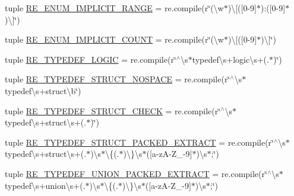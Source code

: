 \begin{DoxyCompactItemize}
\item 
tuple \hyperlink{namespacesrc_1_1regex_ae388af59d56dc2df9faf7175657b3ad9}{R\-E\-\_\-\-E\-N\-U\-M\-\_\-\-I\-M\-P\-L\-I\-C\-I\-T\-\_\-\-R\-A\-N\-G\-E} = re.\-compile(r\char`\"{}(\textbackslash{}w$\ast$)\textbackslash{}\mbox{[}(\mbox{[}0-\/9\mbox{]}$\ast$)\-:(\mbox{[}0-\/9\mbox{]}$\ast$)\textbackslash{}\mbox{]}\char`\"{})
\item 
tuple \hyperlink{namespacesrc_1_1regex_ac607fce0aa1564bce6705ea5e321516b}{R\-E\-\_\-\-E\-N\-U\-M\-\_\-\-I\-M\-P\-L\-I\-C\-I\-T\-\_\-\-C\-O\-U\-N\-T} = re.\-compile(r\char`\"{}(\textbackslash{}w$\ast$)\textbackslash{}\mbox{[}(\mbox{[}0-\/9\mbox{]}$\ast$)\textbackslash{}\mbox{]}\char`\"{})
\item 
tuple \hyperlink{namespacesrc_1_1regex_a41964b62a783025d50229dd3b1839d95}{R\-E\-\_\-\-T\-Y\-P\-E\-D\-E\-F\-\_\-\-L\-O\-G\-I\-C} = re.\-compile(r\char`\"{}$^\wedge$\textbackslash{}s$\ast$typedef\textbackslash{}s+logic\textbackslash{}s+(.$\ast$)\char`\"{})
\item 
tuple \hyperlink{namespacesrc_1_1regex_a05216b8fda75aed760fa7b249bd9b82a}{R\-E\-\_\-\-T\-Y\-P\-E\-D\-E\-F\-\_\-\-S\-T\-R\-U\-C\-T\-\_\-\-N\-O\-S\-P\-A\-C\-E} = re.\-compile(r\char`\"{}$^\wedge$\textbackslash{}s$\ast$typedef\textbackslash{}s+struct\textbackslash{}b\char`\"{})
\item 
tuple \hyperlink{namespacesrc_1_1regex_aebff068eb3879a3f1fbfbfdfedf71e67}{R\-E\-\_\-\-T\-Y\-P\-E\-D\-E\-F\-\_\-\-S\-T\-R\-U\-C\-T\-\_\-\-C\-H\-E\-C\-K} = re.\-compile(r\char`\"{}$^\wedge$\textbackslash{}s$\ast$typedef\textbackslash{}s+struct\textbackslash{}s+(.$\ast$)\char`\"{})
\item 
tuple \hyperlink{namespacesrc_1_1regex_ab4e2f9969b94e72e37a0b3408c960c40}{R\-E\-\_\-\-T\-Y\-P\-E\-D\-E\-F\-\_\-\-S\-T\-R\-U\-C\-T\-\_\-\-P\-A\-C\-K\-E\-D\-\_\-\-E\-X\-T\-R\-A\-C\-T} = re.\-compile(r\char`\"{}$^\wedge$\textbackslash{}s$\ast$typedef\textbackslash{}s+struct\textbackslash{}s+(.$\ast$)\textbackslash{}s$\ast$\textbackslash{}\{(.$\ast$)\textbackslash{}\}\textbackslash{}s$\ast$(\mbox{[}a-\/z\-A-\/Z\-\_-\/9\mbox{]}$\ast$)\textbackslash{}s$\ast$;\char`\"{})
\item 
tuple \hyperlink{namespacesrc_1_1regex_acc79fb8dadfd647b9fcd39556f8b66ab}{R\-E\-\_\-\-T\-Y\-P\-E\-D\-E\-F\-\_\-\-U\-N\-I\-O\-N\-\_\-\-P\-A\-C\-K\-E\-D\-\_\-\-E\-X\-T\-R\-A\-C\-T} = re.\-compile(r\char`\"{}$^\wedge$\textbackslash{}s$\ast$typedef\textbackslash{}s+union\textbackslash{}s+(.$\ast$)\textbackslash{}s$\ast$\textbackslash{}\{(.$\ast$)\textbackslash{}\}\textbackslash{}s$\ast$(\mbox{[}a-\/z\-A-\/Z\-\_-\/9\mbox{]}$\ast$)\textbackslash{}s$\ast$;\char`\"{})

\end{DoxyCompactItemize}
